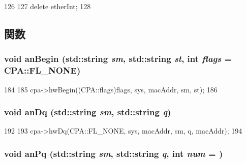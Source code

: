 \begin{DoxyCode}
126 {
127     delete etherInt;
128 }
\end{DoxyCode}


\subsection{関数}
\hypertarget{classIGbE_ac20fadb883428d12627ffa95751acf17}{
\subsubsection[{anBegin}]{\setlength{\rightskip}{0pt plus 5cm}void anBegin (std::string {\em sm}, \/  std::string {\em st}, \/  int {\em flags} = {\ttfamily CPA::FL\_\-NONE})}}
\label{classIGbE_ac20fadb883428d12627ffa95751acf17}



\begin{DoxyCode}
184                                                                      {
185         cpa->hwBegin((CPA::flags)flags, sys, macAddr, sm, st);
186     }
\end{DoxyCode}
\hypertarget{classIGbE_a4d59c58fec3355c64488974a9110bb70}{
\subsubsection[{anDq}]{\setlength{\rightskip}{0pt plus 5cm}void anDq (std::string {\em sm}, \/  std::string {\em q})}}
\label{classIGbE_a4d59c58fec3355c64488974a9110bb70}



\begin{DoxyCode}
192                                          {
193         cpa->hwDq(CPA::FL_NONE, sys, macAddr, sm, q, macAddr);
194     }
\end{DoxyCode}
\hypertarget{classIGbE_a9398b9f9270a0cfcc96ab2f8ad4b2c87}{
\subsubsection[{anPq}]{\setlength{\rightskip}{0pt plus 5cm}void anPq (std::string {\em sm}, \/  std::string {\em q}, \/  int {\em num} = {})}}
\label{classIGbE_a9398b9f9270a0cfcc96ab2f8ad4b2c87}



